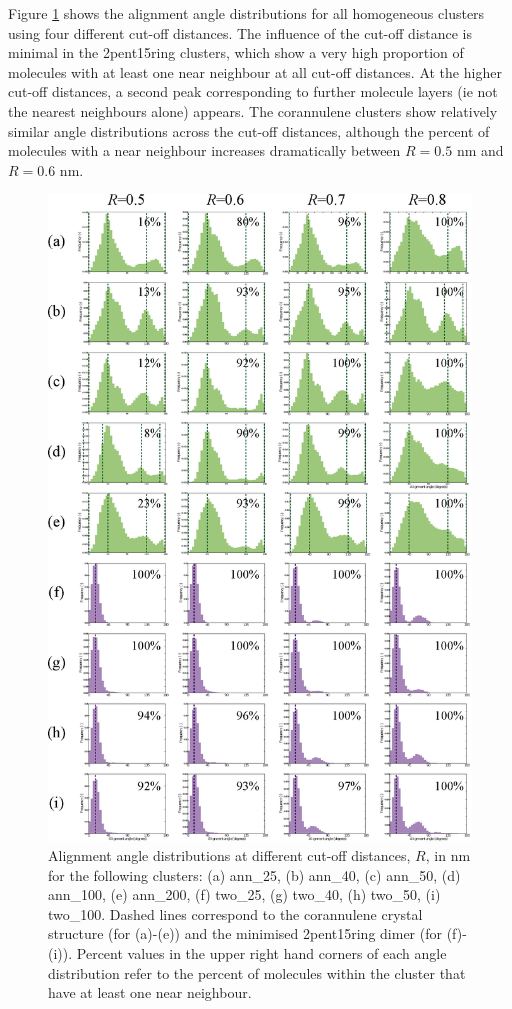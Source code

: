 Figure \ref{figSI:alignmentangles_cutoffs} shows the alignment angle distributions for all homogeneous clusters using four different cut-off distances.  The influence of the cut-off distance is minimal in the 2pent15ring clusters, which show a very high proportion of molecules with at least one near neighbour at all cut-off distances.  At the higher cut-off distances, a second peak corresponding to further molecule layers (ie not the nearest neighbours alone) appears.  The corannulene clusters show relatively similar angle distributions across the cut-off distances, although the percent of molecules with a near neighbour increases dramatically between $R=0.5$ nm and $R=0.6$ nm.  
%
\begin{figure}[!tbh]
\centering
\includegraphics[width=1\linewidth]{Figures/AlignmentAnglesCutoffAssessment_SI.eps}
\caption{Alignment angle distributions at different cut-off distances, $R$, in nm for the following clusters: (a) ann\_25, (b) ann\_40, (c) ann\_50, (d) ann\_100, (e) ann\_200, (f) two\_25, (g) two\_40, (h) two\_50, (i) two\_100. Dashed lines correspond to the corannulene crystal structure (for (a)-(e)) and the minimised 2pent15ring dimer (for (f)-(i)). Percent values in the upper right hand corners of each angle distribution refer to the percent of molecules within the cluster that have at least one near neighbour.}
\label{figSI:alignmentangles_cutoffs}
\end{figure}
%

